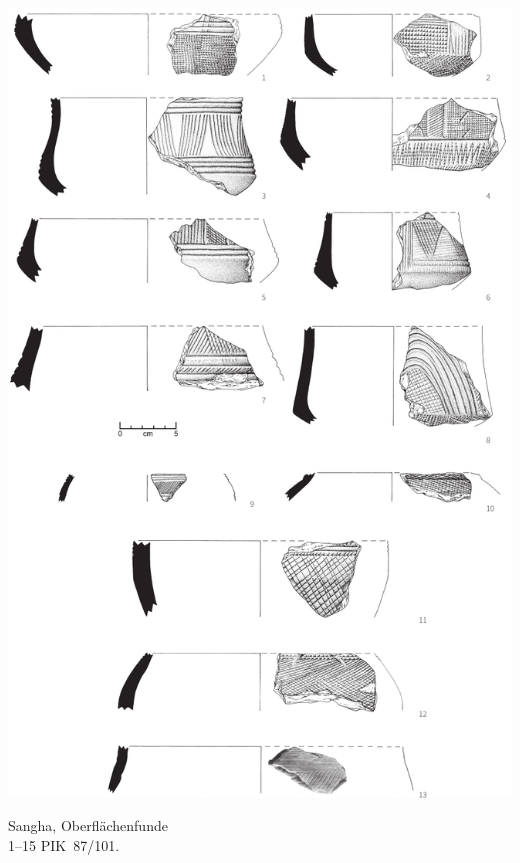 \begin{pl}[H]
	\includegraphics{plt/Taf53.pdf}
	\vspace{.75em}\caption{\mbox{Sangha}, Oberflächenfunde \\ 1--15 PIK~87/101.}
	\label{pl:53}
\end{pl}


